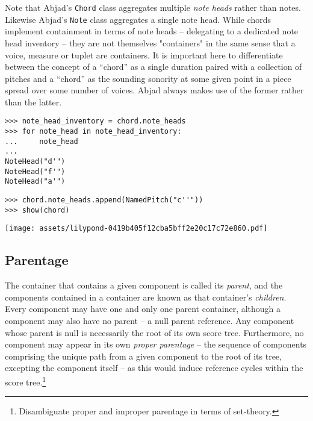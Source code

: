 \noindent Note that Abjad's \texttt{Chord} class aggregates multiple \emph{note
heads} rather than notes. Likewise Abjad's \texttt{Note} class aggregates a
single note head. While chords implement containment in terms of note heads --
delegating to a dedicated note head inventory -- they are not themselves
"containers" in the same sense that a voice, measure or tuplet are containers.
It is important here to differentiate between the concept of a \enquote{chord}
as a single duration paired with a collection of pitches and a \enquote{chord}
as the sounding sonority at some given point in a piece spread over some number
of voices. Abjad always makes use of the former rather than the latter.

\begin{comment}
<abjad>
note_head_inventory = chord.note_heads
for note_head in note_head_inventory:
    note_head

chord.note_heads.append(NamedPitch("c''"))
show(chord)
</abjad>
\end{comment}

\begin{abjadbookoutput}
\begin{singlespacing}
\vspace{-0.5\baselineskip}
\begin{verbatim}
>>> note_head_inventory = chord.note_heads
>>> for note_head in note_head_inventory:
...     note_head
...
NoteHead("d'")
NoteHead("f'")
NoteHead("a'")
\end{verbatim}
\begin{verbatim}
>>> chord.note_heads.append(NamedPitch("c''"))
>>> show(chord)
\end{verbatim}
\noindent\texttt{[image: assets/lilypond-0419b405f12cba5bff2e20c17c72e860.pdf]}
\end{singlespacing}
\end{abjadbookoutput}

\subsection{Parentage}
\label{ssec:parentage}

The container that contains a given component is called its \emph{parent}, and
the components contained in a container are known as that container's
\emph{children}. Every component may have one and only one parent container,
although a component may also have no parent -- a null parent reference. Any
component whose parent is null is necessarily the root of its own score tree.
Furthermore, no component may appear in its own \emph{proper parentage} -- the
sequence of components comprising the unique path from a given component to the
root of its tree, excepting the component itself -- as this would induce
reference cycles within the score tree.\footnote{Disambiguate proper and
improper parentage in terms of set-theory.}

